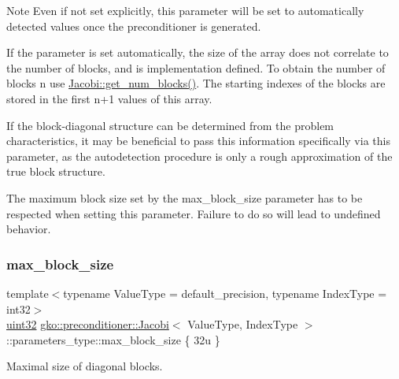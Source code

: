 \begin{DoxyNote}{Note}
Even if not set explicitly, this parameter will be set to automatically detected values once the preconditioner is generated. 

If the parameter is set automatically, the size of the array does not correlate to the number of blocks, and is implementation defined. To obtain the number of blocks {\ttfamily n} use \hyperlink{classgko_1_1preconditioner_1_1Jacobi_afb44d8e560f00f65c46c6813638ce24c}{Jacobi\+::get\+\_\+num\+\_\+blocks()}. The starting indexes of the blocks are stored in the first {\ttfamily n+1} values of this array. 

If the block-\/diagonal structure can be determined from the problem characteristics, it may be beneficial to pass this information specifically via this parameter, as the autodetection procedure is only a rough approximation of the true block structure. 

The maximum block size set by the max\+\_\+block\+\_\+size parameter has to be respected when setting this parameter. Failure to do so will lead to undefined behavior. 
\end{DoxyNote}
\mbox{\label{structgko_1_1preconditioner_1_1Jacobi_1_1parameters__type_a7d11d10b347b25b64b5b916e6a74364e}} 
\subsubsection{\texorpdfstring{max\+\_\+block\+\_\+size}{max\_block\_size}}
{\footnotesize\ttfamily template$<$typename Value\+Type  = default\+\_\+precision, typename Index\+Type  = int32$>$ \\
\hyperlink{namespacegko_a318c831e3fe269ba04c6ed8bf5a71073}{uint32} \hyperlink{classgko_1_1preconditioner_1_1Jacobi}{gko\+::preconditioner\+::\+Jacobi}$<$ Value\+Type, Index\+Type $>$\+::parameters\+\_\+type\+::max\+\_\+block\+\_\+size \{ 32u \}\hspace{0.3cm}{\ttfamily [mutable]}}



Maximal size of diagonal blocks. 

